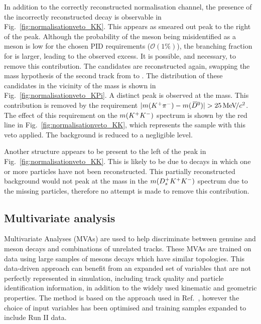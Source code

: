 In addition to the correctly reconstructed normalisation channel, the presence of the incorrectly reconstructed \decay{\Bp}{\Dsp(\decay{\Dzb}{\Kp\pim})} decay is observable in Fig.~\ref{fig:normalisationveto_KK}. This appears as smeared out peak to the right of the \Dzb peak. Although the probability of the \pim meson being misidentified as a \Km meson is low for the chosen PID requirements ($\mathcal{O}(1\%)$), the branching fraction for \decay{\Dzb}{\Kp\pim} is larger, leading to the observed excess. It is possible, and necessary, to remove this contribution. The \Kp\Km candidates are reconstructed again, swapping the mass hypothesis of the second track from \Km to \pim. The distribution of these candidates in the vicinity of the \Dzb mass is shown in Fig.~\ref{fig:normalisationveto_KPi}. A distinct peak is observed at the \Dzb mass. This contribution is removed by the requirement $|m({{K}^+}{{\pi}^-}) - m({{\kern 0.2em\overline{\kern -0.2em D}{}}{}^0})| > 25 {\mathrm{\,Me\kern -0.1em V\!/}c^2}$. The effect of this requirement on the $m({{K}^+}{{K}^-})$ spectrum is shown by the red line in Fig.~\ref{fig:normalisationveto_KK}, which represents the sample with this veto applied. The \decay{\Bp}{\Dsp(\decay{\Dzb}{\Kp\pim})} background is reduced to a negligible level.

Another structure appears to be present to the left of the \Dzb peak in Fig.~\ref{fig:normalisationveto_KK}. This is likely to be due to  decays in which one or more particles have not been reconstructed. This partially reconstructed background would not peak at the \Bp mass in the $m({{D}^+_{s}}{{K}^+}{{K}^-})$ spectrum due to the missing particles, therefore no attempt is made to remove this contribution.


\subsection{Multivariate analysis}
\label{sec:selection_MVA}

Multivariate Analyses (MVAs) are used to help discriminate between genuine \Dsp and \phiz meson decays and combinations of unrelated tracks. 
These MVAs are trained on data using large samples of \B mesons decays which have similar topologies. 
This data-driven approach can benefit from an expanded set of variables that are not perfectly represented in simulation, including track quality and particle identification information, in addition to the widely used kinematic and geometric properties.
The method is based on the approach used in Ref.~\cite{LHCb-PAPER-2012-050}, however the choice of input variables has been optimised and training samples expanded to include Run II data.

